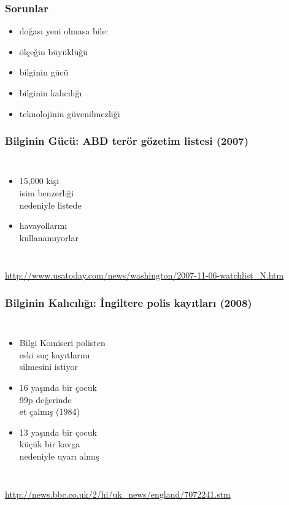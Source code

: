 \documentclass[dvipsnames]{beamer}
\theoremstyle{plain}
\begin{document}
\begin{frame}
  \frametitle{Sorunlar}

  \begin{itemize}
    \item doğası yeni olmasa bile:

    \medskip
    \item ölçeğin büyüklüğü
    \item bilginin gücü
    \item bilginin kalıcılığı
    \item teknolojinin güvenilmezliği
  \end{itemize}
\end{frame}

\begin{frame}
  \frametitle{Bilginin Gücü: ABD terör gözetim listesi (2007)}

  \begin{columns}

    \begin{itemize}
      \item 15,000 kişi\\
        isim benzerliği\\
        nedeniyle listede
      \item havayollarını\\
        kullanamıyorlar
    \end{itemize}
  \end{columns}

  \medskip
  \tiny{\url{http://www.usatoday.com/news/washington/2007-11-06-watchlist_N.htm}}
\end{frame}

\begin{frame}
  \frametitle{Bilginin Kalıcılığı: İngiltere polis kayıtları (2008)}

  \begin{columns}

    \begin{itemize}
      \item Bilgi Komiseri polisten\\
        eski suç kayıtlarını\\
        silmesini istiyor

      \medskip
      \item 16 yaşında bir çocuk\\
        99p değerinde\\
        et çalmış (1984)
      \item 13 yaşında bir çocuk\\
        küçük bir kavga\\
        nedeniyle uyarı almış
    \end{itemize}
  \end{columns}

  \medskip
  \tiny{\url{http://news.bbc.co.uk/2/hi/uk_news/england/7072241.stm}}
\end{frame}
\end{document}
